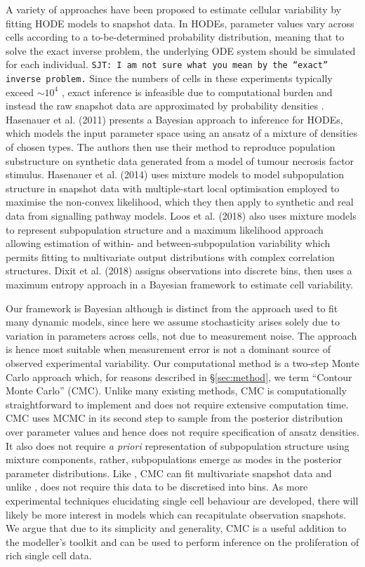 A variety of approaches have been proposed to estimate cellular variability by fitting HODE models to snapshot data. In HODEs, parameter values vary across cells according to a to-be-determined probability distribution, meaning that to solve the exact inverse problem, the underlying ODE system should be simulated for each individual. {\tt SJT: I am not sure what you mean by the ``exact'' inverse problem.} Since the numbers of cells in these experiments typically exceed $\sim10^4$ \cite{hasenauer2011identification}, exact inference is infeasible due to computational burden and instead the raw snapshot data are approximated by probability densities \cite{hasenauer2011identification,hasenauer2014ode,loos2018hierarchical,dixit2018maximum}. Hasenauer et al. (2011) presents a Bayesian approach to inference for HODEs, which models the input parameter space using an ansatz of a mixture of densities of chosen types. The authors then use their method to reproduce population substructure on synthetic data generated from a model of tumour necrosis factor stimulus. Hasenauer et al. (2014) uses mixture models to model subpopulation structure in snapshot data with multiple-start local optimisation employed to maximise the non-convex likelihood, which they then apply to synthetic and real data from signalling pathway models. Loos et al. (2018) also uses mixture models to represent subpopulation structure and a maximum likelihood approach allowing estimation of within- and between-subpopulation variability which permits fitting to multivariate output distributions with complex correlation structures. Dixit et al. (2018) assigns observations into discrete bins, then uses a maximum entropy approach in a Bayesian framework to estimate cell variability.

Our framework is Bayesian although is distinct from the approach used to fit many dynamic models, since here we assume stochasticity arises solely due to variation in parameters across cells, not due to measurement noise. The approach is hence most suitable when measurement error is not a dominant source of observed experimental variability. Our computational method is a two-step Monte Carlo approach which, for reasons described in \S \ref{sec:method}, we term ``Contour Monte Carlo'' (CMC). Unlike many existing methods, CMC is computationally straightforward to implement and does not require extensive computation time. CMC uses MCMC in its second step to sample from the posterior distribution over parameter values and hence does not require specification of ansatz densities. It also does not require \textit{a priori} representation of subpopulation structure using mixture components, rather, subpopulations emerge as modes in the posterior parameter distributions. Like \cite{loos2018hierarchical}, CMC can fit multivariate snapshot data and unlike \cite{dixit2018maximum}, does not require this data to be discretised into bins. As more experimental techniques elucidating single cell behaviour are developed, there will likely be more interest in models which can recapitulate observation snapshots. We argue that due to its simplicity and generality, CMC is a useful addition to the modeller's toolkit and can be used to perform inference on the proliferation of rich single cell data.


